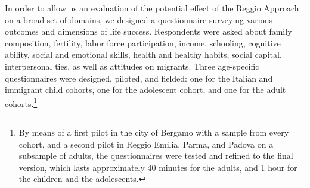 
In order to allow us an evaluation of the potential effect of the Reggio Approach on a broad set of domains, we designed a questionnaire surveying various outcomes and dimensions of life success. Respondents were asked about family composition, fertility, labor force participation, income, schooling, cognitive ability, social and emotional skills, health and healthy habits, social capital, interpersonal ties, as well as attitudes on migrants. Three age-specific questionnaires were designed, piloted, and fielded: one for the Italian and immigrant child cohorts, one for the adolescent cohort, and one for the adult cohorts.\footnote{By means of a first pilot in the city of Bergamo with a sample from every cohort, and a second pilot in Reggio Emilia, Parma, and Padova on a subsample of adults, the questionnaires were tested and refined to the final version, which lasts approximately 40 minutes for the adults, and 1 hour for the children and the adolescents.}


